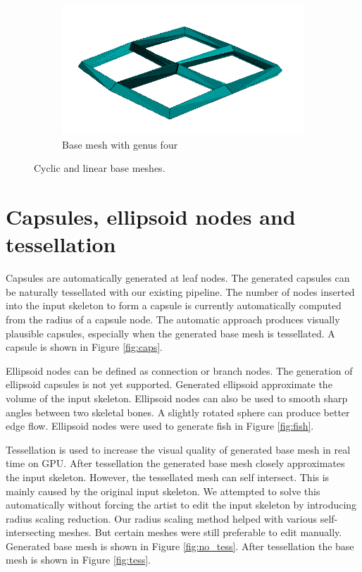 \begin{figure}[h]
        \begin{subfigure}[b]{0.5\textwidth}
                \includegraphics[width=\textwidth]{images/cycle_mesh.png}
                \caption{Base mesh with genus four}
                \label{fig:cyclic_mesh}
        \end{subfigure}
        \caption[Cyclic and linear base meshes]{Cyclic and linear base meshes.}\label{fig:pavuk}
\end{figure}

\section{Capsules, ellipsoid nodes and tessellation}

Capsules are automatically generated at leaf nodes.
The generated capsules can be naturally tessellated with our existing pipeline.
The number of nodes inserted into the input skeleton to form a capsule is currently automatically computed from the radius of a capsule node.
The automatic approach produces visually plausible capsules, especially when the generated base mesh is tessellated.
A capsule is shown in Figure \ref{fig:caps}.

Ellipsoid nodes can be defined as connection or branch nodes.
The generation of ellipsoid capsules is not yet supported.
Generated ellipsoid approximate the volume of the input skeleton.
Ellipsoid nodes can also be used to smooth sharp angles between two skeletal bones.
A slightly rotated sphere can produce better edge flow.
Ellipsoid nodes were used to generate fish in Figure \ref{fig:fish}.

Tessellation is used to increase the visual quality of generated base mesh in real time on GPU.
After tessellation the generated base mesh closely approximates the input skeleton.
However, the tessellated mesh can self intersect.
This is mainly caused by the original input skeleton.
We attempted to solve this automatically without forcing the artist to edit the input skeleton by introducing radius scaling reduction.
Our radius scaling method helped with various self-intersecting meshes.
But certain meshes were still preferable to edit manually.
Generated base mesh is shown in Figure \ref{fig:no_tess}.
After tessellation the base mesh is shown in Figure \ref{fig:tess}.

